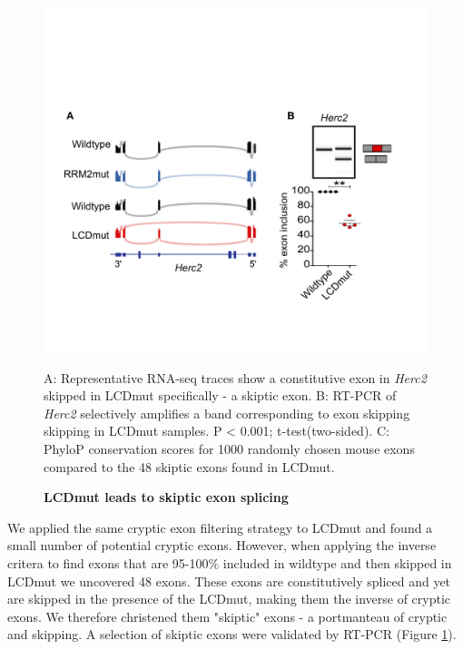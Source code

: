 \begin{figure}[h!]
	\centering
	\includegraphics[width=14cm]{Figures/05_tdp_mice/skiptic_exon_multi.png}
	\caption{\textbf{LCDmut leads to skiptic exon splicing}}
	A: Representative RNA-seq traces show a constitutive exon in \textit{Herc2} skipped in LCDmut specifically - a skiptic exon. B: RT-PCR of \textit{Herc2} selectively amplifies a band corresponding to exon skipping skipping in LCDmut samples. P < 0.001; t-test(two-sided). C: PhyloP conservation scores for 1000 randomly chosen mouse exons compared to the 48 skiptic exons found in LCDmut.
	\label{fig:skiptic_multi}
\end{figure}

We applied the same cryptic exon filtering strategy to LCDmut and found a small number of potential cryptic exons. However, when applying the inverse critera to find exons that are 95-100\% included in wildtype and then skipped in LCDmut we uncovered 48 exons. These exons are constitutively spliced and yet are skipped in the presence of the LCDmut, making them the inverse of cryptic exons. We therefore christened them "skiptic" exons - a portmanteau of cryptic and skipping. A selection of skiptic exons were validated by RT-PCR (Figure \ref{fig:skiptic_multi}). 


